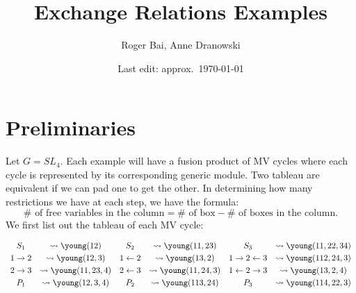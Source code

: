 \documentclass{article}
\title{Exchange Relations Examples}
\author{Roger Bai, Anne Dranowski}
\date{Last edit: approx.\ \today}
\begin{document}
\maketitle
\tableofcontents

\section{Preliminaries}
Let $G = SL_4$. Each example will have a fusion product of MV cycles where each cycle is represented by its corresponding generic module. Two tableau are equivalent if we can pad one to get the other. In determining how many restrictions we have at each step, we have the formula:
$$ \#\text{ of free variables in the column} = \#\text{ of box} - \#\text{ of boxes in the column}.$$
We first list out the tableau of each MV cycle:

\[\begin{array}{cccccc} \vspace{1mm}
    S_1 &\leadsto \young(12) & S_2 &\leadsto \young(11,23) & S_3 &\leadsto \young(11,22,34) \\ \vspace{1mm}
    1 \rightarrow 2 &\leadsto \young(12,3) & 1 \leftarrow 2 &\leadsto \young(13,2) & 1 \rightarrow 2 \leftarrow 3 &\leadsto \young(112,24,3) \\ \vspace{1mm}
    2 \rightarrow 3 &\leadsto \young(11,23,4) & 2 \leftarrow 3 &\leadsto \young(11,24,3) & 1 \leftarrow 2 \rightarrow 3 &\leadsto \young(13,2,4) \\
    P_1 &\leadsto \young(12,3,4) & P_2 &\leadsto \young(113,24) & P_3 &\leadsto \young(114,22,3)
\end{array}\]
\end{document}
